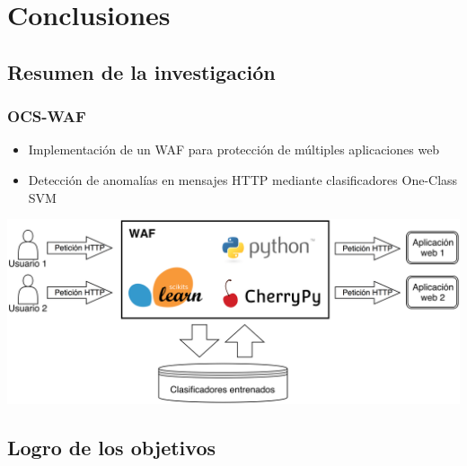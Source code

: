 \section{Conclusiones}



\subsection{Resumen de la investigación}

\begin{frame}
    \frametitle{OCS-WAF}

    \begin{itemize}
        \item
        Implementación de un WAF para protección de múltiples aplicaciones
        web

        \item
        Detección de anomalías en mensajes HTTP mediante clasificadores
        One-Class SVM
    \end{itemize}

    \begin{center}
        \includegraphics[width=\textwidth]{images/waf-diagram-overview.png}
    \end{center}
\end{frame}



\subsection{Logro de los objetivos}


